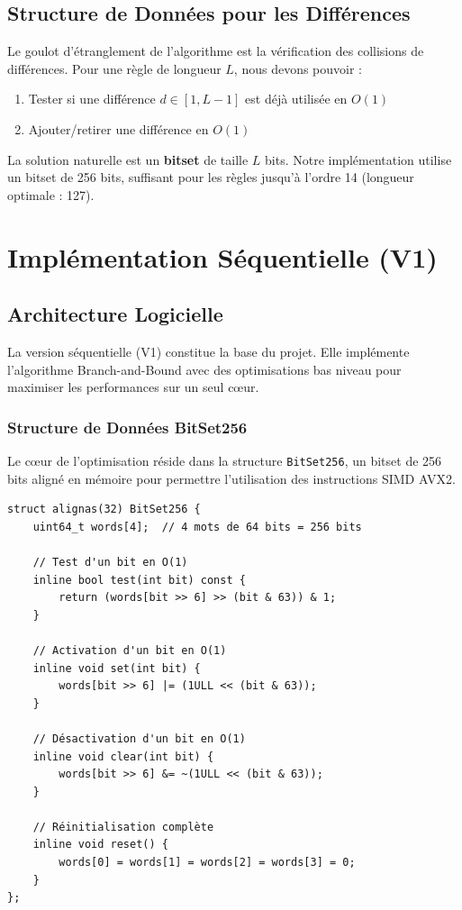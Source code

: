 \documentclass[12pt,a4paper,twoside]{report}
\begin{document}
\section{Structure de Données pour les Différences}

Le goulot d'étranglement de l'algorithme est la vérification des collisions de différences. Pour une règle de longueur $L$, nous devons pouvoir :
\begin{enumerate}
    \item Tester si une différence $d \in [1, L-1]$ est déjà utilisée en $O(1)$
    \item Ajouter/retirer une différence en $O(1)$
\end{enumerate}

La solution naturelle est un \textbf{bitset} de taille $L$ bits. Notre implémentation utilise un bitset de 256 bits, suffisant pour les règles jusqu'à l'ordre 14 (longueur optimale : 127).


\chapter{Implémentation Séquentielle (V1)}

\section{Architecture Logicielle}

La version séquentielle (V1) constitue la base du projet. Elle implémente l'algorithme Branch-and-Bound avec des optimisations bas niveau pour maximiser les performances sur un seul cœur.

\subsection{Structure de Données BitSet256}

Le cœur de l'optimisation réside dans la structure \texttt{BitSet256}, un bitset de 256 bits aligné en mémoire pour permettre l'utilisation des instructions SIMD AVX2.

\begin{lstlisting}[caption={Structure BitSet256 avec alignement mémoire}]
struct alignas(32) BitSet256 {
    uint64_t words[4];  // 4 mots de 64 bits = 256 bits

    // Test d'un bit en O(1)
    inline bool test(int bit) const {
        return (words[bit >> 6] >> (bit & 63)) & 1;
    }

    // Activation d'un bit en O(1)
    inline void set(int bit) {
        words[bit >> 6] |= (1ULL << (bit & 63));
    }

    // Désactivation d'un bit en O(1)
    inline void clear(int bit) {
        words[bit >> 6] &= ~(1ULL << (bit & 63));
    }

    // Réinitialisation complète
    inline void reset() {
        words[0] = words[1] = words[2] = words[3] = 0;
    }
};
\end{lstlisting}
\end{document}
